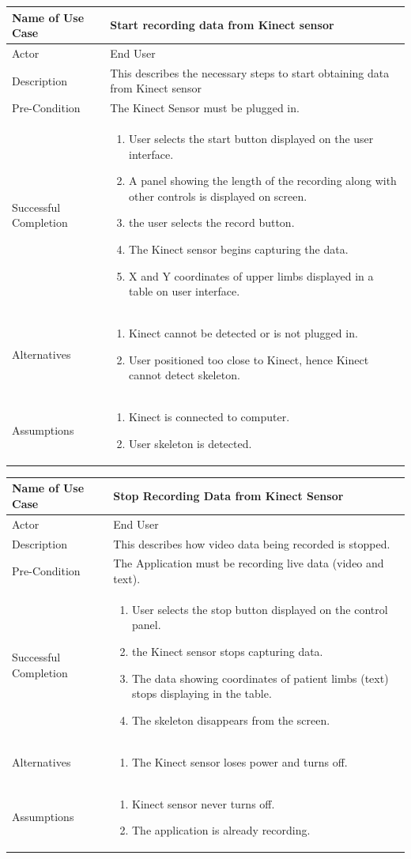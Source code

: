 \documentclass[a4paper, 12pt]{article}
\newcommand\addrow[2]{#1 &#2\\ }
\newcommand\addheading[2]{#1 &#2\\ \hline}
\newcommand\tabularhead{\begin{tabular}{lp{8cm}}
\hline
}
\newcommand\addmulrow[2]{ \begin{minipage}[t][][t]{2.5cm}#1\end{minipage}%
   &\begin{minipage}[t][][t]{8cm}
    \begin{enumerate} #2   \end{enumerate}
    \end{minipage}\\ }
\newenvironment{usecase}{\tabularhead}
{\hline\end{tabular}}
\begin{document}
\begin{usecase}
	\addheading{Name of Use Case}{Start recording data from Kinect sensor}
	\addrow{Actor}{End User}
	\addrow{Description}{This describes the necessary steps to start obtaining data from Kinect sensor}
	\addrow{Pre-Condition}{The Kinect Sensor must be plugged in.}
	\addmulrow{Successful Completion}{
		\item User selects the start button displayed on the user interface. 
		\item A panel showing the length of the recording along with other controls is displayed on screen.
		\item the user selects the record button.
		\item The Kinect sensor begins capturing the data. 
		\item X and Y coordinates of upper limbs displayed in a table on user interface.}
	\addmulrow{Alternatives}{ 
	\item Kinect cannot be detected or is not plugged in.
	\item User positioned too close to Kinect, hence Kinect cannot detect skeleton.}
	\addmulrow{Assumptions}{
	\item Kinect is connected to computer. 
	\item User skeleton is detected.}
\end{usecase}

\begin{usecase}
	\addheading{Name of Use Case}{Stop Recording Data from Kinect Sensor}
	\addrow{Actor}{End User}
	\addrow{Description}{This describes how video data being recorded is stopped.}
	\addrow{Pre-Condition}{The Application must be recording live data (video and text).}
	\addmulrow{Successful Completion}{
		\item User selects the stop button displayed on the control panel. 
		\item the Kinect sensor stops capturing data.
		\item The data showing coordinates of patient limbs (text) stops displaying in the table. 
		\item The skeleton disappears from the screen.}
	\addmulrow{Alternatives}{ 
	\item The Kinect sensor loses power and turns off.}
	\addmulrow{Assumptions}{
	\item Kinect sensor never turns off. 
	\item The application is already recording.}
\end{usecase}
\end{document}
